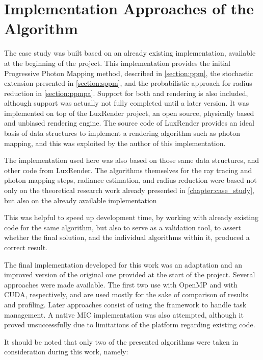 \documentclass[main.tex]{subfiles}
\begin{document}
\chapter{Implementation Approaches of the Algorithm} \label{chapter:impl}

The case study was built based on an already existing implementation, available at the beginning of the project. This implementation provides the initial Progressive Photon Mapping method, described in \cref{section:ppm}, the stochastic extension presented in \cref{section:sppm}, and the probabilistic approach for radius reduction in \cref{section:ppmpa}. Support for both \cpu and \cuda rendering is also included, although \cuda support was actually not fully completed until a later version. It was implemented on top of the LuxRender project, an open source, physically based and unbiased rendering engine. The source code of LuxRender provides an ideal basis of data structures to implement a rendering algorithm such as photon mapping, and this was exploited by the author of this implementation.

The implementation used here was also based on those same data structures, and other code from LuxRender. The algorithms themselves for the ray tracing and photon mapping steps, radiance estimation, and radius reduction were based not only on the theoretical research work already presented in \cref{chapter:case_study}, but also on the already available implementation

This was helpful to speed up development time, by working with already existing code for the same algorithm, but also to serve as a validation tool, to assert whether the final solution, and the individual algorithms within it, produced a correct result.

The final implementation developed for this work was an adaptation and an improved version of the original one provided at the start of the project. Several approaches were made available. The first two use \cpus with \acs{OpenMP} and \gpus with \acs{CUDA}, respectively, and are used mostly for the sake of comparison of results and profiling. Later approaches consist of using the \starpu framework to handle task management.
A native \acs{MIC} implementation was also attempted, although it proved unsuccessfully due to limitations of the platform regarding existing code.

It should be noted that only two of the presented algorithms were taken in consideration during this work, namely:
\end{document}
